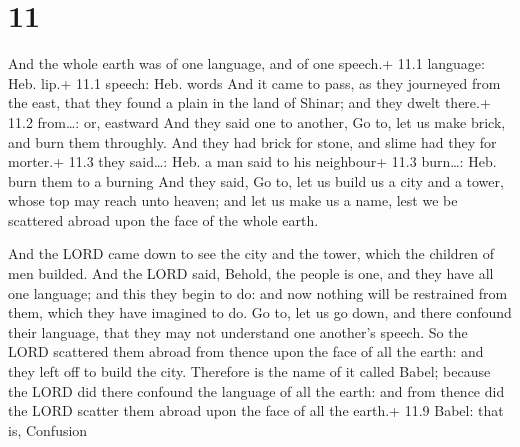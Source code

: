 \hypertarget{section-10}{%
\section{11}\label{section-10}}

 And the whole earth was of one language, and of one
speech.+ 11.1 language: Heb. lip.+ 11.1 speech: Heb. words 
And it came to pass, as they journeyed from the east, that they found a
plain in the land of Shinar; and they dwelt there.+ 11.2 from\ldots: or,
eastward  And they said one to another, Go to, let us make
brick, and burn them throughly. And they had brick for stone, and slime
had they for morter.+ 11.3 they said\ldots: Heb. a man said to his
neighbour+ 11.3 burn\ldots: Heb. burn them to a burning  And
they said, Go to, let us build us a city and a tower, whose top may
reach unto heaven; and let us make us a name, lest we be scattered
abroad upon the face of the whole earth.

 And the LORD came down to see the city and the tower, which
the children of men builded.  And the LORD said, Behold, the
people is one, and they have all one language; and this they begin to
do: and now nothing will be restrained from them, which they have
imagined to do.  Go to, let us go down, and there confound
their language, that they may not understand one another's speech.
 So the LORD scattered them abroad from thence upon the face
of all the earth: and they left off to build the city. 
Therefore is the name of it called Babel; because the LORD did there
confound the language of all the earth: and from thence did the LORD
scatter them abroad upon the face of all the earth.+ 11.9 Babel: that
is, Confusion

